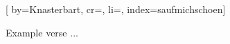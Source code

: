 
[%
    by={Knasterbart},
    cr={},
    li={},
    index={saufmichschoen}]


    \label{saufmichschoen}

    \beginverse
        Example verse ...
    \endverse
\endsong
